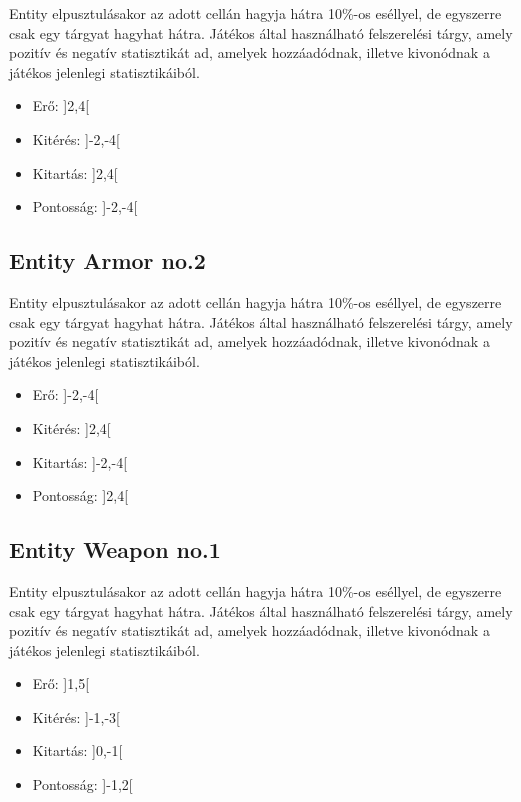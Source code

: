Entity elpusztulásakor az adott cellán hagyja hátra 10\%-os eséllyel, de egyszerre csak egy tárgyat hagyhat hátra.
Játékos által használható felszerelési tárgy, amely pozitív és negatív statisztikát ad, amelyek hozzáadódnak, illetve kivonódnak a játékos jelenlegi statisztikáiból.

\begin{itemize}
    \item Erő: ]2,4[
    \item Kitérés: ]-2,-4[
    \item Kitartás: ]2,4[
    \item Pontosság: ]-2,-4[
\end{itemize}

\subsection{Entity Armor no.2}

Entity elpusztulásakor az adott cellán hagyja hátra 10\%-os eséllyel, de egyszerre csak egy tárgyat hagyhat hátra.
Játékos által használható felszerelési tárgy, amely pozitív és negatív statisztikát ad, amelyek hozzáadódnak, illetve kivonódnak a játékos jelenlegi statisztikáiból.

\begin{itemize}
    \item Erő: ]-2,-4[
    \item Kitérés: ]2,4[
    \item Kitartás: ]-2,-4[
    \item Pontosság: ]2,4[
\end{itemize}

\subsection{Entity Weapon no.1}

Entity elpusztulásakor az adott cellán hagyja hátra 10\%-os eséllyel, de egyszerre csak egy tárgyat hagyhat hátra.
Játékos által használható felszerelési tárgy, amely pozitív és negatív statisztikát ad, amelyek hozzáadódnak, illetve kivonódnak a játékos jelenlegi statisztikáiból.

\begin{itemize}
    \item Erő: ]1,5[
    \item Kitérés: ]-1,-3[
    \item Kitartás: ]0,-1[
    \item Pontosság: ]-1,2[
\end{itemize}


